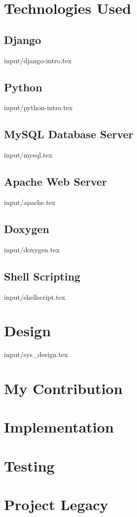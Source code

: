 \chapter{Technologies Used}
\section{Django}
 {input/django-intro.tex}
%
\section{Python} 

 {input/python-intro.tex}
\section{MySQL Database Server}
 {input/mysql.tex}
\section{Apache Web Server}
 {input/apache.tex}

\section{Doxygen}
 {input/doxygen.tex}

\section{Shell Scripting}
 {input/shellscript.tex}

\chapter{Design}
 {input/sys_design.tex}


\chapter{My Contribution}


\chapter{Implementation}

\chapter{Testing}

\chapter{Project Legacy}


